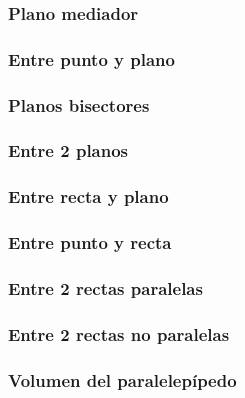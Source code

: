 \subsubsection{Plano mediador}
\subsubsection{Entre punto y plano}
\subsubsection{Planos bisectores}
\subsubsection{Entre 2 planos}
\subsubsection{Entre recta y plano}
\subsubsection{Entre punto y recta}
\subsubsection{Entre 2 rectas paralelas}
\subsubsection{Entre 2 rectas no paralelas}

\subsubsection{Volumen del paralelepípedo}
